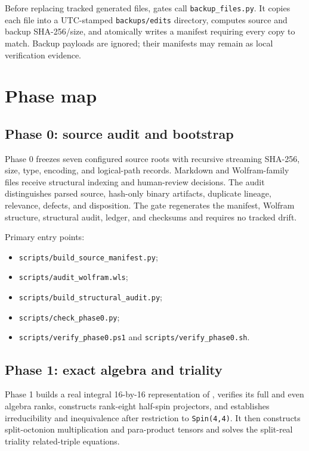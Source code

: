 \documentclass[11pt]{article}
\begin{document}
Before replacing tracked generated files, gates call \texttt{backup\_f\allowbreak{}iles.py}. It copies each file into a UTC-stamped \texttt{backups/\allowbreak{}edits} directory, computes source and backup SHA-256/size, and atomically writes a manifest requiring every copy to match. Backup payloads are ignored; their manifests may remain as local verification evidence.

\section{Phase map}

\subsection{Phase 0: source audit and bootstrap}

Phase 0 freezes seven configured source roots with recursive streaming SHA-256, size, type, encoding, and logical-path records. Markdown and Wolfram-family files receive structural indexing and human-review decisions. The audit distinguishes parsed source, hash-only binary artifacts, duplicate lineage, relevance, defects, and disposition. The gate regenerates the manifest, Wolfram structure, structural audit, ledger, and checksums and requires no tracked drift.

Primary entry points:

\begin{itemize}
\item \texttt{scripts/\allowbreak{}build\_so\allowbreak{}urce\_man\allowbreak{}ifest.py};
\item \texttt{scripts/\allowbreak{}audit\_wo\allowbreak{}lfram.wl\allowbreak{}s};
\item \texttt{scripts/\allowbreak{}build\_st\allowbreak{}ructural\allowbreak{}\_audit.p\allowbreak{}y};
\item \texttt{scripts/\allowbreak{}check\_ph\allowbreak{}ase0.py};
\item \texttt{scripts/\allowbreak{}verify\_p\allowbreak{}hase0.ps\allowbreak{}1} and \texttt{scripts/\allowbreak{}verify\_p\allowbreak{}hase0.sh}.
\end{itemize}

\subsection{Phase 1: exact algebra and triality}

Phase 1 builds a real integral 16-by-16 representation of \texttt{}, verifies its full and even algebra ranks, constructs rank-eight half-spin projectors, and establishes irreducibility and inequivalence after restriction to \texttt{Spin(4,4\allowbreak{})}. It then constructs split-octonion multiplication and para-product tensors and solves the split-real triality related-triple equations.
\end{document}
